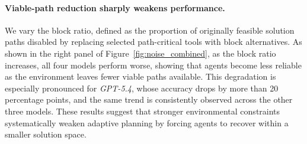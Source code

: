 \paragraph{Viable-path reduction sharply weakens performance.}
We vary the block ratio, defined as the proportion of originally feasible solution paths disabled by replacing selected path-critical tools with block alternatives. 
As shown in the right panel of Figure~\ref{fig:noise_combined}, as the block ratio increases, all four models perform worse, showing that agents become less reliable as the environment leaves fewer viable paths available. 
This degradation is especially pronounced for \textit{GPT-5.4}, whose accuracy drops by more than 20 percentage points, and the same trend is consistently observed across the other three models.
These results suggest that stronger environmental constraints systematically weaken adaptive planning by forcing agents to recover within a smaller solution space.




